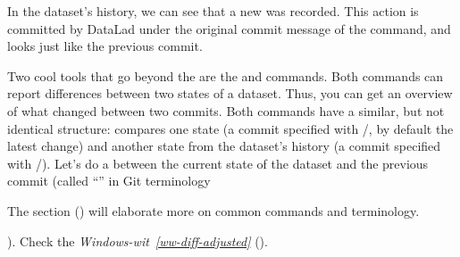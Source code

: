 \sphinxAtStartPar
In the dataset’s history,
we can see that a new  was recorded. This action is
committed by DataLad under the original commit message of the 
command, and looks just like the previous  commit.

\ignorespaces 
\sphinxAtStartPar
Two cool tools that go beyond the 
are the  and  commands.
Both commands can report differences between two states of
a dataset. Thus, you can get an overview of what changed between two commits.
Both commands have a similar, but not identical structure: 
compares one state (a commit specified with /,
by default the latest change)
and another state from the dataset’s history (a commit specified with
/). Let’s do a  between the current state
of the dataset and the previous commit (called “” in Git terminology%
\begin{footnote}\sphinxAtStartFootnote
The section {\hyperref[\detokenize{basics/101-137-history:history}]{}} () will elaborate more on common {\hyperref[\detokenize{glossary:term-Git}]{}} commands
and terminology.
%
\end{footnote}).
Check the \textit{Windows-wit}~{\windowswiticoninline}\textit{\ref{ww-diff-adjusted}} {\hyperref[\detokenize{basics/101-109-rerun:ww-diff-adjusted}]{}} ().

